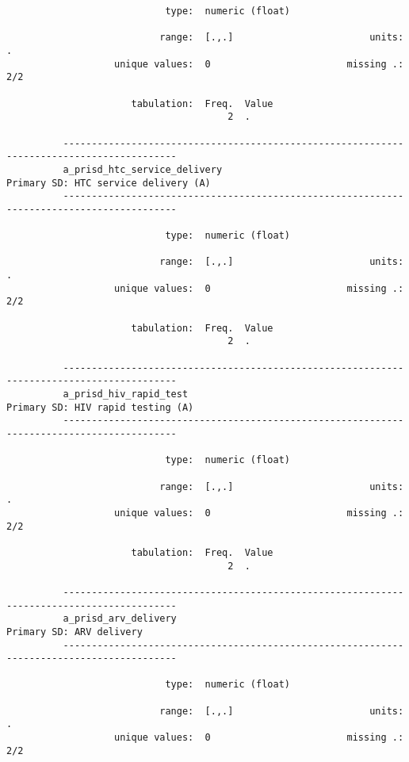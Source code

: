 \documentclass{article}
\begin{document}
\begin{verbatim}
                            type:  numeric (float)
          
                           range:  [.,.]                        units:  .
                   unique values:  0                        missing .:  2/2
          
                      tabulation:  Freq.  Value
                                       2  .
          
          ------------------------------------------------------------------------------------------
          a_prisd_htc_service_delivery                          Primary SD: HTC service delivery (A)
          ------------------------------------------------------------------------------------------
          
                            type:  numeric (float)
          
                           range:  [.,.]                        units:  .
                   unique values:  0                        missing .:  2/2
          
                      tabulation:  Freq.  Value
                                       2  .
          
          ------------------------------------------------------------------------------------------
          a_prisd_hiv_rapid_test                                   Primary SD: HIV rapid testing (A)
          ------------------------------------------------------------------------------------------
          
                            type:  numeric (float)
          
                           range:  [.,.]                        units:  .
                   unique values:  0                        missing .:  2/2
          
                      tabulation:  Freq.  Value
                                       2  .
          
          ------------------------------------------------------------------------------------------
          a_prisd_arv_delivery                                              Primary SD: ARV delivery
          ------------------------------------------------------------------------------------------
          
                            type:  numeric (float)
          
                           range:  [.,.]                        units:  .
                   unique values:  0                        missing .:  2/2
          

\end{verbatim}
\end{document}
